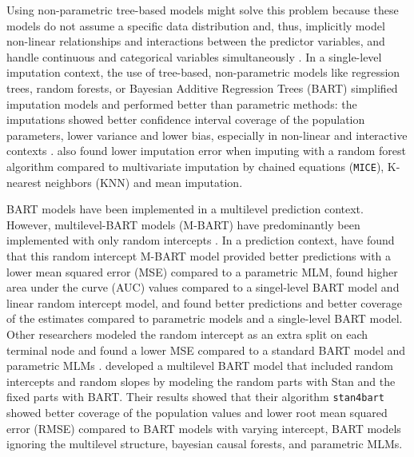 \documentclass[10pt, a4paper, titlepage]{article}
\begin{document}
Using non-parametric tree-based models might solve this problem because these models do not assume a specific data distribution and, thus, implicitly model non-linear relationships and interactions between the predictor variables, and handle continuous and categorical variables simultaneously \citep{hill2020, burgette2010, lin2019, chipman2010, james2021, salditt2023, breiman1984}. In a single-level imputation context, the use of tree-based, non-parametric models like regression trees, random forests, or Bayesian Additive Regression Trees (BART) simplified imputation models and performed better than parametric methods: the imputations showed better confidence interval coverage of the population parameters, lower variance and lower bias, especially in non-linear and interactive contexts \citep{burgette2010, xu2016, silva2022}. \citet{waljee2013} also found lower imputation error when imputing with a random forest algorithm compared to multivariate imputation by chained equations (\texttt{MICE}), K-nearest neighbors (KNN) and mean imputation.

BART models have been implemented in a multilevel prediction context. However, multilevel-BART models (M-BART) have predominantly been implemented with only random intercepts \citep{chen2020, wagner2020, tan2016, wundervald2022}. In a prediction context, \citet{wagner2020} have found that this random intercept M-BART model provided better predictions with a lower mean squared error (MSE) compared to a parametric MLM, \citet{tan2016} found higher area under the curve (AUC) values compared to a singel-level BART model and linear random intercept model, and \citet{chen2020} found better predictions and better coverage of the estimates compared to parametric models and a single-level BART model. Other researchers modeled the random intercept as an extra split on each terminal node and found a lower MSE compared to a standard BART model and parametric MLMs \citep{wundervald2022}. \citet{dorie2022} developed a multilevel BART model that included random intercepts and random slopes by modeling the random parts with Stan \citep{lee2017} and the fixed parts with BART. Their results showed that their algorithm \texttt{stan4bart} showed better coverage of the population values and lower root mean squared error (RMSE) compared to BART models with varying intercept, BART models ignoring the multilevel structure, bayesian causal forests, and parametric MLMs.
\end{document}
